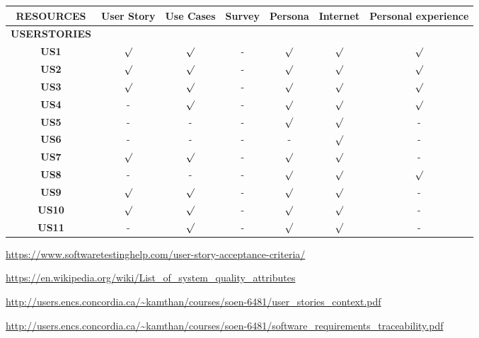 \documentclass[12pt, a4paper]{article}
\begin{document}
\newpage
\begin{flushleft}
\begin{tabular}{|c|c|c|c|c|c|c|}
    \hline
    \textbf{RESOURCES} & \textbf{User Story} & \textbf{Use Cases} & \textbf{Survey} & \textbf{Persona} & \textbf{Internet} & \textbf{Personal experience} \\
    \hline
    \textbf{USERSTORIES} &  &  &  &  &  &  \\
    \hline
    \textbf{US1} & $\surd$ & $\surd$ & - & $\surd$ & $\surd$ & $\surd$ \\
    \hline
    \textbf{US2} & $\surd$ & $\surd$ & - & $\surd$ & $\surd$ & $\surd$ \\
    \hline
    \textbf{US3} & $\surd$ & $\surd$ & - & $\surd$ & $\surd$ & $\surd$ \\
    \hline
    \textbf{US4} & - & $\surd$ & - & $\surd$ & $\surd$ & $\surd$ \\
    \hline
    \textbf{US5} & - & - & - & $\surd$ & $\surd$ & - \\
    \hline 
    \textbf{US6} & - & - & - & - & $\surd$ & -  \\
    \hline 
    \textbf{US7} & $\surd$ & $\surd$ & - & $\surd$ & $\surd$ & -  \\
    \hline 
    \textbf{US8} & - & - & - & $\surd$ & $\surd$ & $\surd$ \\
    \hline 
    \textbf{US9} & $\surd$ & $\surd$ & - & $\surd$ & $\surd$ & - \\
    \hline 
    \textbf{US10} & $\surd$ & $\surd$ & - & $\surd$ & $\surd$ & -  \\
    \hline 
    \textbf{US11} & - & $\surd$ & - & $\surd$ & $\surd$ & -  \\
    \hline 
\end{tabular}
\end{flushleft}



\newpage
\begin{thebibliography}{99}
\bibitem{}\url{https://www.softwaretestinghelp.com/user-story-acceptance-criteria/}

\bibitem{}\url{https://en.wikipedia.org/wiki/List_of_system_quality_attributes}

\bibitem{}\url{http://users.encs.concordia.ca/~kamthan/courses/soen-6481/user_stories_context.pdf}

\bibitem{}\url{http://users.encs.concordia.ca/~kamthan/courses/soen-6481/software_requirements_traceability.pdf}

\end{thebibliography}
\end{document}

